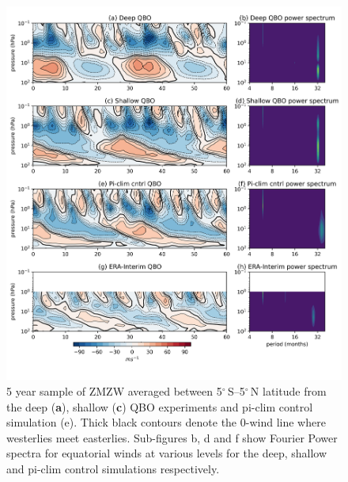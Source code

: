 \begin{figure}[h!]
\begin{center}
\noindent\includegraphics[width = \linewidth]{Figures/Figures-deepQBO/experiment_QBOs.png}
\caption[Equatorial ZMZW time-height profiles from QBO experiments]{5 year sample of ZMZW averaged between 5$^{\circ}$\,S--5$^{\circ}$\,N latitude from the deep (\textbf{a}), shallow (\textbf{c}) QBO experiments and pi-clim control simulation (e). Thick black contours denote the 0-wind line where westerlies meet easterlies. Sub-figures b, d and f show Fourier Power spectra for equatorial winds at various levels for the deep, shallow and pi-clim control simulations respectively.}
\label{fig:experiment_QBOs}
\end{center}
\end{figure}

